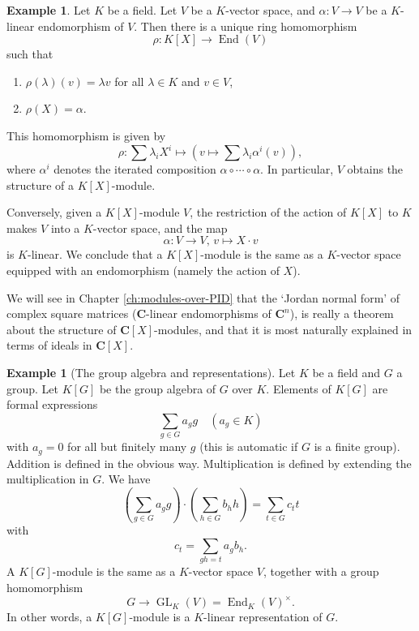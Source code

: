 \documentclass[11pt]{amsbook}
\DeclareMathOperator{\End}{\mathrm{End}}
\DeclareMathOperator\GL{GL}
\def\bC{{\mathbf{C}}} \def\bP{{\mathbf{P}}} \def\bA{{\mathbf{A}}}
\theoremstyle{plain}
\theoremstyle{definition}
\newtheorem{example}[theorem]{Example}
\begin{document}
\begin{example}\label{exa:vect-with-endo}
Let $K$ be a field. Let $V$ be a $K$-vector space, and $\alpha\colon V\to V$ be a $K$-linear endomorphism of $V$. Then there is a unique ring homomorphism
\[
	\rho\colon K[X] \to \End(V)
\]
such that 
\begin{enumerate}
\item $\rho(\lambda)(v) = \lambda v$ for all $\lambda \in K$ and $v\in V$\!, 
\item $\rho(X)=\alpha$.	
\end{enumerate}
This homomorphism is given by
\begin{equation}\label{eq:vect-with-endo}	
	\rho\colon \sum \lambda_i X^i \mapsto \left( v \mapsto \sum \lambda_i \alpha^i(v) \right),
\end{equation}
where $\alpha^i$ denotes the iterated composition $\alpha \circ \cdots \circ \alpha$. In particular, $V$ obtains the structure of a $K[X]$-module.

Conversely, given a $K[X]$-module $V$, the restriction of the action of $K[X]$ to $K$ makes $V$ into a $K$-vector space, and the map
\[
	\alpha\colon V \to V,\, v \mapsto X\cdot v
\]
is $K$-linear. We conclude that a $K[X]$-module is the same as a $K$-vector space equipped with an endomorphism (namely the action of $X$).

We will see in Chapter \ref{ch:modules-over-PID} that the `Jordan normal form' of complex square matrices ($\bC$-linear endomorphisms of $\bC^n$), is really a theorem about the structure of $\bC[X]$-modules, and that it is most naturally explained in  terms of ideals in $\bC[X]$.
\end{example}


\begin{example}[The group algebra and representations]\label{exa:group-algebra}
Let $K$ be a field and $G$ a group. Let $K[G]$ be the group algebra of $G$ over $K$. Elements of $K[G]$ are formal expressions 
\[
	\sum_{g\in G} a_g g \quad (a_g \in K)
\]
with $a_g=0$ for all but  finitely many $g$ (this is automatic if $G$ is a finite group).
Addition is defined in the obvious way. Multiplication is defined by extending the multiplication in $G$. We have
\[
	\left(\sum_{g\in G} a_g g \right) \cdot \left(\sum_{h\in G} b_h h \right)
	= \sum_{t \in G} c_t t
\]
with
\[
	c_t = \sum_{gh=t} a_gb_h.
\]
A $K[G]$-module is the same as a $K$-vector space $V$, together with a group homomorphism
\[
	G \to \GL_K(V) = \End_K(V)^\times.
\]
In other words, a $K[G]$-module is a $K$-linear representation of $G$.
\end{example}
\end{document}

